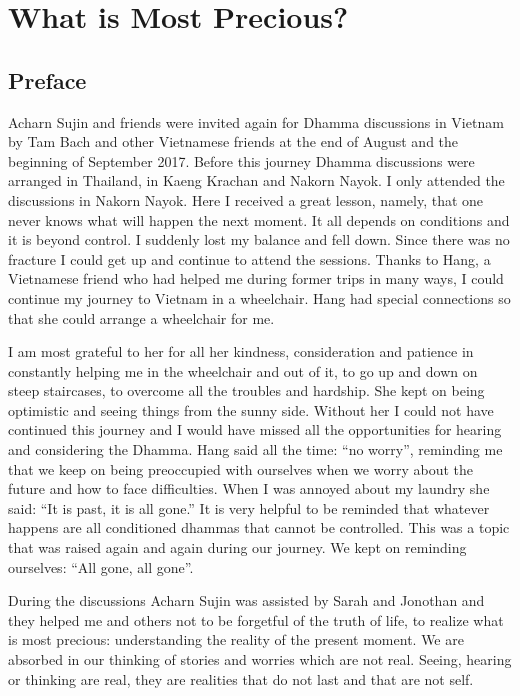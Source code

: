 \part{What is Most Precious?}
\chapter{Preface}

Acharn Sujin and friends were invited again for Dhamma discussions in
Vietnam by Tam Bach and other Vietnamese friends at the end of August
and the beginning of September 2017. Before this journey Dhamma
discussions were arranged in Thailand, in Kaeng Krachan and Nakorn
Nayok. I only attended the discussions in Nakorn Nayok. Here I received
a great lesson, namely, that one never knows what will happen the next
moment. It all depends on conditions and it is beyond control. I
suddenly lost my balance and fell down. Since there was no fracture I
could get up and continue to attend the sessions. Thanks to Hang, a
Vietnamese friend who had helped me during former trips in many ways, I
could continue my journey to Vietnam in a wheelchair. Hang had special
connections so that she could arrange a wheelchair for me.

I am most grateful to her for all her kindness, consideration and
patience in constantly helping me in the wheelchair and out of it, to go
up and down on steep staircases, to overcome all the troubles and
hardship. She kept on being optimistic and seeing things from the
sunny side. Without her I could not have continued this journey and I
would have missed all the opportunities for hearing and considering the
Dhamma. Hang said all the time: ``no worry'', reminding me that we keep
on being preoccupied with ourselves when we worry about the future and
how to face difficulties. When I was annoyed about my laundry she said:
``It is past, it is all gone.'' It is very helpful to be reminded that
whatever happens are all conditioned dhammas that cannot be controlled.
This was a topic that was raised again and again during our journey. We
kept on reminding ourselves: ``All gone, all gone''.

During the discussions Acharn Sujin was assisted by Sarah and Jonothan
and they helped me and others not to be forgetful of the truth of life,
to realize what is most precious: understanding the reality of the
present moment. We are absorbed in our thinking of stories and worries
which are not real. Seeing, hearing or thinking are real, they are
realities that do not last and that are not self.
